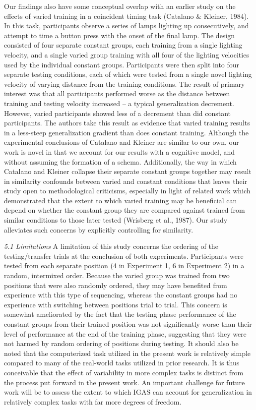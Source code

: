 \documentclass[
  man,floatsintext]{apa7}
\begin{document}
Our findings also have some conceptual overlap with an earlier study on the effects of varied training in a coincident timing task (Catalano \& Kleiner, 1984). In this task, participants observe a series of lamps lighting up consecutively, and attempt to time a button press with the onset of the final lamp. The design consisted of four separate constant groups, each training from a single lighting velocity, and a single varied group training with all four of the lighting velocities used by the individual constant groups. Participants were then split into four separate testing conditions, each of which were tested from a single novel lighting velocity of varying distance from the training conditions. The result of primary interest was that all participants performed worse as the distance between training and testing velocity increased -- a typical generalization decrement. However, varied participants showed less of a decrement than did constant participants. The authors take this result as evidence that varied training results in a less-steep generalization gradient than does constant training. Although the experimental conclusions of Catalano and Kleiner are similar to our own, our work is novel in that we account for our results with a cognitive model, and without assuming the formation of a schema. Additionally, the way in which Catalano and Kleiner collapse their separate constant groups together may result in similarity confounds between varied and constant conditions that leaves their study open to methodological criticisms, especially in light of related work which demonstrated that the extent to which varied training may be beneficial can depend on whether the constant group they are compared against trained from similar conditions to those later tested (Wrisberg et al., 1987). Our study alleviates such concerns by explicitly controlling for similarity.

\emph{5.1 Limitations}
A limitation of this study concerns the ordering of the testing/transfer trials at the conclusion of both experiments. Participants were tested from each separate position (4 in Experiment 1, 6 in Experiment 2) in a random, intermixed order. Because the varied group was trained from two positions that were also randomly ordered, they may have benefited from experience with this type of sequencing, whereas the constant groups had no experience with switching between positions trial to trial. This concern is somewhat ameliorated by the fact that the testing phase performance of the constant groups from their trained position was not significantly worse than their level of performance at the end of the training phase, suggesting that they were not harmed by random ordering of positions during testing. It should also be noted that the computerized task utilized in the present work is relatively simple compared to many of the real-world tasks utilized in prior research. It is thus conceivable that the effect of variability in more complex tasks is distinct from the process put forward in the present work. An important challenge for future work will be to assess the extent to which IGAS can account for generalization in relatively complex tasks with far more degrees of freedom.
\end{document}
